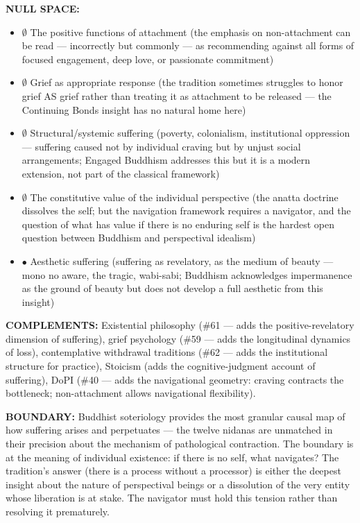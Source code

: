 \textbf{NULL SPACE:}

\begin{itemize}[nosep,leftmargin=*]
  \item $\emptyset$ The positive functions of attachment (the emphasis on non-attachment can be read — incorrectly but commonly — as recommending against all forms of focused engagement, deep love, or passionate commitment)
  \item $\emptyset$ Grief as appropriate response (the tradition sometimes struggles to honor grief AS grief rather than treating it as attachment to be released — the Continuing Bonds insight has no natural home here)
  \item $\emptyset$ Structural/\allowbreak systemic suffering (poverty, colonialism, institutional oppression — suffering caused not by individual craving but by unjust social arrangements; Engaged Buddhism addresses this but it is a modern extension, not part of the classical framework)
  \item $\emptyset$ The constitutive value of the individual perspective (the anatta doctrine dissolves the self; but the navigation framework requires a navigator, and the question of what has value if there is no enduring self is the hardest open question between Buddhism and perspectival idealism)
  \item $\bullet$ Aesthetic suffering (suffering as revelatory, as the medium of beauty — mono no aware, the tragic, wabi-sabi; Buddhism acknowledges impermanence as the ground of beauty but does not develop a full aesthetic from this insight)
\end{itemize}


\textbf{COMPLEMENTS:} Existential philosophy (\#61 — adds the positive-revelatory dimension of suffering), grief psychology (\#59 — adds the longitudinal dynamics of loss), contemplative withdrawal traditions (\#62 — adds the institutional structure for practice), Stoicism (adds the cognitive-judgment account of suffering), DoPI (\#40 — adds the navigational geometry: craving contracts the bottleneck; non-attachment allows navigational flexibility).


\textbf{BOUNDARY:} Buddhist soteriology provides the most granular causal map of how suffering arises and perpetuates — the twelve nidanas are unmatched in their precision about the mechanism of pathological contraction. The boundary is at the meaning of individual existence: if there is no self, what navigates? The tradition's answer (there is a process without a processor) is either the deepest insight about the nature of perspectival beings or a dissolution of the very entity whose liberation is at stake. The navigator must hold this tension rather than resolving it prematurely.


